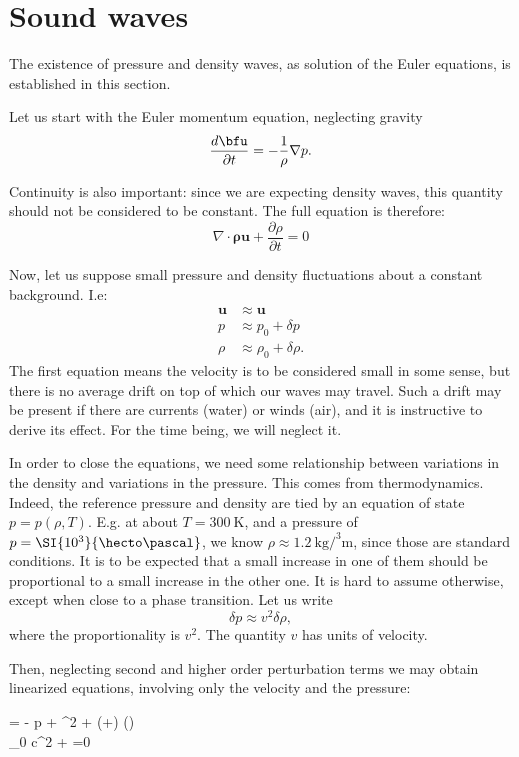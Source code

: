 \section{Sound waves}

The existence of pressure and density waves, as solution of the Euler
equations, is established in this section.

Let us start with the Euler momentum equation, neglecting gravity
\[
\frac{d \bfu }{\partial t}=
- \frac{1}{\rho} \nabla p  .
\]

Continuity is also important: since we are expecting density waves,
this quantity should not be considered to be constant. The full
equation is therefore:
\[
\nabla \cdot \mathbf{\rho u} + \frac{\partial
\rho}{\partial t} =0
\]

Now, let us suppose small pressure and density fluctuations about a
constant background. I.e:
\begin{align}
\mathbf{u} & \approx \mathbf{u} \\
p          & \approx p_0+\delta p \\
\rho       & \approx \rho_0+\delta \rho .
\end{align}
The first equation means the velocity is to be considered small in
some sense, but there is no average drift on top of which our waves
may travel. Such a drift may be present if there are currents (water) or
winds (air), and it is instructive to derive its effect. For the time
being, we will neglect it.

In order to close the equations, we need some relationship between
variations in the density and variations in the pressure. This comes
from thermodynamics. Indeed, the reference pressure and density are
tied by an equation of state $p=p(\rho,T)$. E.g. at about
$T=\SI{300}{\kelvin}$, and a pressure of $p=\SI{10^3}{\hecto\pascal}$,
we know $\rho\approx\SI{1.2}{\kilo\gram\per\cubed\meter}$, since those
are standard conditions. It is to be expected that a small increase in
one of them should be proportional to a small increase in the other
one. It is hard to assume otherwise, except when close to a phase
transition. Let us write
\[
  \delta p \approx v^2 \delta \rho ,
\]
where the proportionality is $v^2$. The quantity $v$ has units of
velocity.

Then, neglecting second and higher order perturbation terms we may
obtain linearized equations, involving only the velocity and the
pressure:


  = -  \nabla
p + \nu \nabla^2  + \left(+\nu\right)
\nabla (\nabla\cdot{}) \\
\rho_0 c^2 \nabla \cdot {} +  =0 \]



